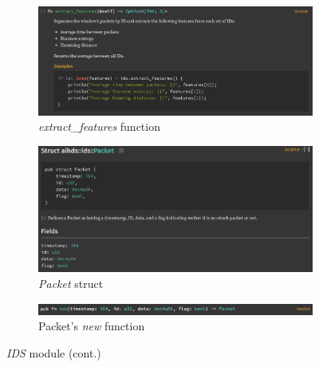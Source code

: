\begin{figure}
    \ContinuedFloat
    \begin{subfigure}[b]{\linewidth}
        \includegraphics[width = \linewidth]{img/parts/docs/ids/ids_struct_extractfeatures.png}
        \caption{\emph{extract\_features} function}
        \label{subfig:doc_ids_stuct_extractfeatures}
    \end{subfigure}
    \begin{subfigure}[b]{\linewidth}
        \includegraphics[width = \linewidth]{img/parts/docs/ids/packet_struct.png}
        \caption{\emph{Packet} struct}
        \label{subfig:doc_packet_struct}
    \end{subfigure}
    \begin{subfigure}[b]{\linewidth}
        \includegraphics[width = \linewidth]{img/parts/docs/ids/packet_struct_new.png}
        \caption{Packet's \emph{new} function}
        \label{subfig:doc_packet_struct_new}
    \end{subfigure}
    \caption{\emph{IDS} module (cont.)}
    \label{fig:doc_ids}
\end{figure}
